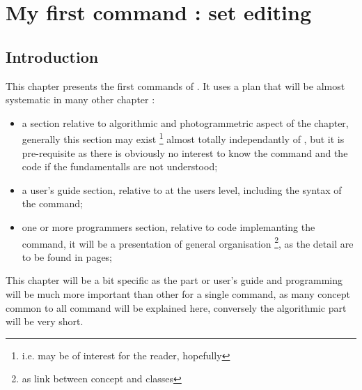 


\chapter{My first command : set editing}


\section{Introduction}

This chapter presents the first commands of \PPP . It uses a plan that will be almost
systematic in many other chapter :

\begin{itemize}
   \item a section relative to algorithmic and photogrammetric aspect of the chapter, generally this
         section may exist \footnote{i.e. may be of interest for the reader, hopefully}
         almost totally independantly of \PPP, but it is pre-requisite as
         there is obviously no interest to know the command and the code if the fundamentalls are
         not understood;

   \item a  user's guide section, relative to \PPP at the users level, including the syntax of the command;

   \item one or more   programmers  section, relative to \CPP code implemanting the command, it will be a
         presentation of general organisation \footnote{as link between concept and classes},
         as the detail are to be found in \doxy pages;

\end{itemize}

This chapter will be a bit specific as the part or user's guide and programming will be much more important 
than other for a single command, as many concept common to all command will be explained here,
conversely  the algorithmic part will be very short.

